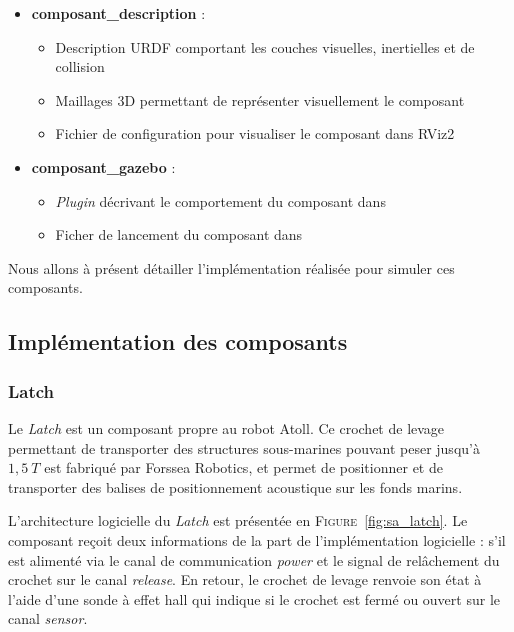 			\begin{itemize}
				\renewcommand{\labelitemi}{\textbullet}
				\item \textbf{composant\_description} :
				\begin{itemize}[noitemsep]
					\item Description URDF comportant les couches visuelles, inertielles et de collision
					\item Maillages 3D permettant de représenter visuellement le composant
					\item Fichier de configuration pour visualiser le composant dans RViz2
				\end{itemize}
				\item \textbf{composant\_gazebo} :
				\begin{itemize}[noitemsep]
					\item \textit{Plugin} décrivant le comportement du composant dans \gazebo{}
					\item Ficher de lancement du composant dans \gazebo{}
				\end{itemize}
			\end{itemize}

		Nous allons à présent détailler l'implémentation réalisée pour simuler ces composants.

		\subsection{Implémentation des composants}

			\subsubsection{Latch}

				Le \textit{Latch} est un composant propre au robot \gls{Atoll}. Ce crochet de levage permettant de transporter des structures sous-marines pouvant peser jusqu'à $1,5\ T$ est fabriqué par Forssea Robotics, et permet de positionner et de transporter des balises de positionnement acoustique sur les fonds marins.

				L'architecture logicielle du \textit{Latch} est présentée en \textsc{Figure}~\ref{fig:sa_latch}. Le composant reçoit deux informations de la part de l'implémentation logicielle : s'il est alimenté via le canal de communication \textit{power} et le signal de relâchement du crochet sur le canal \textit{release}. En retour, le crochet de levage renvoie son état à l'aide d'une sonde à effet hall qui indique si le crochet est fermé ou ouvert sur le canal \textit{sensor}.

